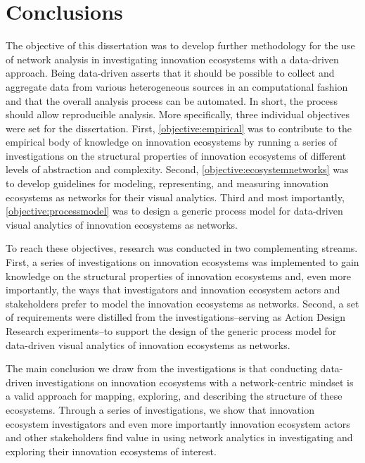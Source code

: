 \chapter{Conclusions}
\label{ch:conclusions}

The objective of this dissertation was to develop further methodology for the use of network analysis in investigating innovation ecosystems with a data-driven approach. Being data-driven asserts that it should be possible to collect and aggregate data from various heterogeneous sources in an computational fashion and that the overall analysis process can be automated. In short, the process should allow reproducible analysis. More specifically, three individual objectives were set for the dissertation. First, \ref{objective:empirical} was to contribute to the empirical body of knowledge on innovation ecosystems by running a series of investigations on the structural properties of innovation ecosystems of different levels of abstraction and complexity. Second, \ref{objective:ecosystemnetworks} was to develop guidelines for modeling, representing, and measuring innovation ecosystems as networks for their visual analytics. Third and most importantly, \ref{objective:processmodel} was to design a generic process model for data-driven visual analytics of innovation ecosystems as networks.

To reach these objectives, research was conducted in two complementing streams. First, a series of investigations on innovation ecosystems was implemented to gain knowledge on the structural properties of innovation ecosystems and, even more importantly, the ways that investigators and innovation ecosystem actors and stakeholders prefer to model the innovation ecosystems as networks. Second, a set of requirements were distilled from the investigations--serving as Action Design Research \citep{Sein2011ActionResearch} experiments--to support the design of the generic process model for data-driven visual analytics of innovation ecosystems as networks.

The main conclusion we draw from the investigations is that conducting data-driven investigations on innovation ecosystems with a network-centric mindset is a valid approach for mapping, exploring, and describing the structure of these ecosystems. Through a series of investigations, we show that innovation ecosystem investigators and even more importantly innovation ecosystem actors and other stakeholders find value in using network analytics in investigating and exploring their innovation ecosystems of interest. 


